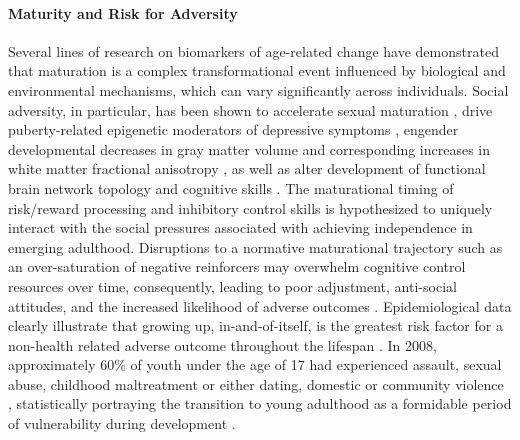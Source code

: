 \documentclass[utf8]{stylesheet}
\begin{document}
\paragraph{Maturity and Risk for Adversity}
Several lines of research on biomarkers of age-related change have demonstrated that maturation is a complex transformational event influenced by biological and environmental mechanisms, which can vary significantly across individuals. Social adversity, in particular, has been shown to accelerate sexual maturation \citep{rickard2014childhood}, drive puberty-related epigenetic moderators of depressive symptoms \citep{sumner2019early}, engender developmental decreases in gray matter volume and corresponding increases in white matter fractional anisotropy \citep{gur2019burden, Gogtay2004}, as well as alter development of functional brain network topology \citep{tooley2020associations} and cognitive skills \citep{mclaughlin2019childhood, belsky2019early}. The maturational timing of risk/reward processing and inhibitory control skills is hypothesized to uniquely interact with the social pressures associated with achieving independence in emerging adulthood. Disruptions to a normative maturational trajectory such as an over-saturation of negative reinforcers may overwhelm cognitive control resources over time, consequently, leading to poor adjustment, anti-social attitudes, and the increased likelihood of adverse outcomes \citep{raine2006neural,inzlicht2015emotional}. Epidemiological data clearly illustrate that growing up, in-and-of-itself, is the greatest risk factor for a non-health related adverse outcome throughout the lifespan \citep{turner2006effect}. In 2008, approximately 60\% of youth under the age of 17 had experienced assault, sexual abuse, childhood maltreatment or either dating, domestic or community violence \citep{finkelhor2009children}, statistically portraying the transition to young adulthood as a formidable period of vulnerability during development \citep*{berzin2010vulnerability}.
%
\end{document}
